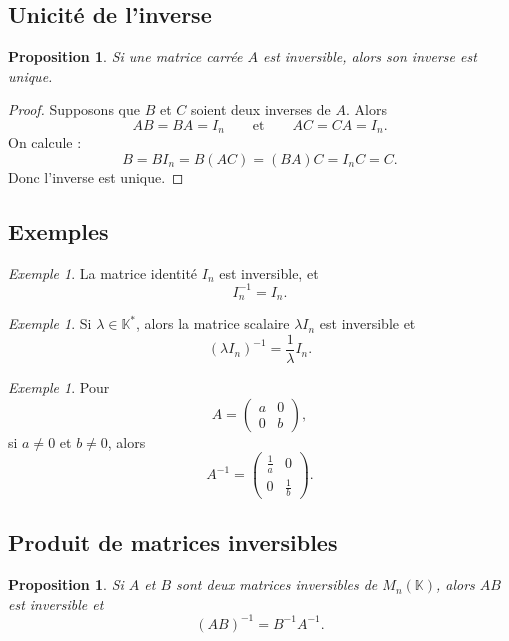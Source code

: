 \documentclass[11pt,a4paper]{article}
\newtheorem{proposition}[definition]{Proposition}
\theoremstyle{remark}
\newtheorem{exemple}[definition]{Exemple}
\newcommand{\K}{\mathbb{K}}
\begin{document}
\subsection{Unicité de l’inverse}

\begin{proposition}
Si une matrice carrée \(A\) est inversible, alors son inverse est unique.
\end{proposition}

\begin{proof}
Supposons que \(B\) et \(C\) soient deux inverses de \(A\). Alors
\[
AB=BA=I_n
\qquad \text{et} \qquad
AC=CA=I_n.
\]
On calcule :
\[
B=BI_n=B(AC)=(BA)C=I_nC=C.
\]
Donc l’inverse est unique.
\end{proof}

\subsection{Exemples}

\begin{exemple}
La matrice identité \(I_n\) est inversible, et
\[
I_n^{-1}=I_n.
\]
\end{exemple}

\begin{exemple}
Si \(\lambda\in\K^\ast\), alors la matrice scalaire \(\lambda I_n\) est inversible et
\[
(\lambda I_n)^{-1}=\frac{1}{\lambda}I_n.
\]
\end{exemple}

\begin{exemple}
Pour
\[
A=
\begin{pmatrix}
a & 0\\
0 & b
\end{pmatrix},
\]
si \(a\neq 0\) et \(b\neq 0\), alors
\[
A^{-1}=
\begin{pmatrix}
\frac1a & 0\\
0 & \frac1b
\end{pmatrix}.
\]
\end{exemple}

\subsection{Produit de matrices inversibles}

\begin{proposition}
Si \(A\) et \(B\) sont deux matrices inversibles de \(M_n(\K)\), alors \(AB\) est inversible et
\[
(AB)^{-1}=B^{-1}A^{-1}.
\]
\end{proposition}
\end{document}
